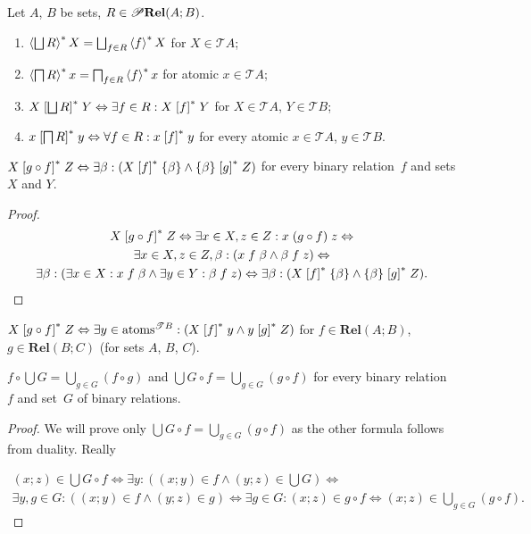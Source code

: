 \begin{cor}
Let $A$, $B$ be sets, $R\in\mathscr{P}\mathbf{Rel}(A;B)$.
\begin{enumerate}
\item \textbf{$\left\langle \bigsqcup R\right\rangle ^{\ast}X=\bigsqcup_{f\in R}\left\langle f\right\rangle ^{\ast}X$} for
$X\in\mathscr{T}A$;
\item $\left\langle \bigsqcap R\right\rangle ^{\ast}x=\bigsqcap_{f\in R}\left\langle f\right\rangle ^{\ast}x$ for atomic
$x\in\mathscr{T}A$;
\item $X\mathrel{\left[\bigsqcup R\right]^{\ast}}Y\Leftrightarrow\exists f\in R:X\mathrel{\left[f\right]^{\ast}}Y$
for $X\in\mathscr{T}A$, $Y\in\mathscr{T}B$;
\item $x\mathrel{\left[\bigsqcap R\right]^{\ast}}y\Leftrightarrow\forall f\in R:x\mathrel{\left[f\right]^{\ast}}y$
for every atomic $x\in\mathscr{T}A$, $y\in\mathscr{T}B$.
\end{enumerate}
\end{cor}
\begin{prop}
$X\mathrel{\left[g\circ f\right]^{\ast}}Z\Leftrightarrow\exists\beta:(X\mathrel{\left[f\right]^{\ast}}\{\beta\}\land\{\beta\}\mathrel{\left[g\right]^{\ast}}Z)$
for every binary relation~$f$ and sets $X$ and $Y$.\end{prop}
\begin{proof}
~
\begin{multline*}
X\mathrel{\left[g\circ f\right]^{\ast}}Z\Leftrightarrow\exists x\in X,z\in Z:x\mathrel{(g\circ f)}z\Leftrightarrow\\
\exists x\in X,z\in Z,\beta:(x\mathrel f\beta\land\beta\mathrel fz)\Leftrightarrow\\
\exists\beta:(\exists x\in X:x\mathrel f\beta\land\exists y\in Y:\beta\mathrel fz)\Leftrightarrow\exists\beta:(X\mathrel{\left[f\right]^{\ast}}\{\beta\}\land\{\beta\}\mathrel{\left[g\right]^{\ast}}Z).
\end{multline*}
\end{proof}
\begin{cor}
$X\mathrel{\left[g\circ f\right]^{\ast}}Z\Leftrightarrow\exists y\in\operatorname{atoms}^{\mathscr{T}B}:(X\mathrel{\left[f\right]^{\ast}}y\land y\mathrel{\left[g\right]^{\ast}}Z)$
for $f\in\mathbf{Rel}(A;B)$, $g\in\mathbf{Rel}(B;C)$ (for sets $A$,
$B$, $C$).\end{cor}
\begin{prop}
$f\circ\bigcup G=\bigcup_{g\in G}(f\circ g)$ and $\bigcup G\circ f=\bigcup_{g\in G}(g\circ f)$
for every binary relation~$f$ and set~$G$ of binary relations.\end{prop}
\begin{proof}
We will prove only $\bigcup G\circ f=\bigcup_{g\in G}(g\circ f)$
as the other formula follows from duality. Really

\begin{multline*}
(x;z)\in\bigcup G\circ f\Leftrightarrow\exists y:((x;y)\in f\land(y;z)\in\bigcup G)\Leftrightarrow\\
\exists y,g\in G:((x;y)\in f\land(y;z)\in g)\Leftrightarrow\exists g\in G:(x;z)\in g\circ f\Leftrightarrow(x;z)\in\bigcup_{g\in G}(g\circ f).
\end{multline*}
\end{proof}

